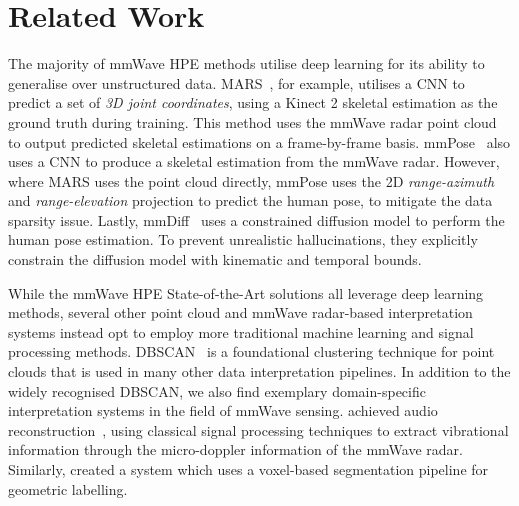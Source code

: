 \section{Related Work}
\label{section: background - related work}



The majority of mmWave HPE methods utilise deep learning for its ability to generalise over unstructured data.
MARS~\cite{an2021mars}, for example, utilises a CNN to predict a set of \textit{3D joint coordinates}, using a Kinect 2 skeletal estimation as the ground truth during training.
This method uses the mmWave radar point cloud to output predicted skeletal estimations on a frame-by-frame basis.
mmPose~\cite{sengupta2020mmpose} also uses a CNN to produce a skeletal estimation from the mmWave radar.
However, where MARS uses the point cloud directly, mmPose uses the 2D \textit{range-azimuth} and \textit{range-elevation} projection to predict the human pose, to mitigate the data sparsity issue.
Lastly, mmDiff~\cite{junqiao2025diffusion} uses a constrained diffusion model to perform the human pose estimation.
To prevent unrealistic hallucinations, they explicitly constrain the diffusion model with kinematic and temporal bounds.

While the mmWave HPE State-of-the-Art solutions all leverage deep learning methods, several other point cloud and mmWave radar-based interpretation systems instead opt to employ more traditional machine learning and signal processing methods.
DBSCAN~\cite{ester1996dbscan} is a foundational clustering technique for point clouds that is used in many other data interpretation pipelines.
In addition to the widely recognised DBSCAN, we also find exemplary domain-specific interpretation systems in the field of mmWave sensing.
 achieved audio reconstruction~\cite{li2025acoustic}, using classical signal processing techniques to extract vibrational information through the micro-doppler information of the mmWave radar.
Similarly, \citeauthor{poux2019voxel} \cite{poux2019voxel} created a system which uses a voxel-based segmentation pipeline for geometric labelling.


